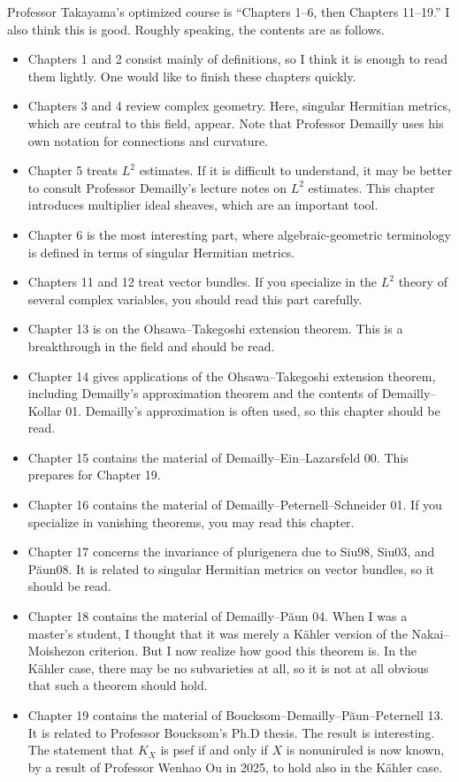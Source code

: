 Professor Takayama's optimized course is ``Chapters 1--6, then Chapters 11--19.'' I also think this is good. Roughly speaking, the contents are as follows.
\vspace{-8pt}
\begin{itemize}[left=0pt]
  \setlength{\parskip}{0cm} %
  \setlength{\itemsep}{0cm} %
\item Chapters 1 and 2 consist mainly of definitions, so I think it is enough to read them lightly. One would like to finish these chapters quickly.
\item Chapters 3 and 4 review complex geometry. Here, singular Hermitian metrics, which are central to this field, appear. Note that Professor Demailly uses his own notation for connections and curvature.
\item Chapter 5 treats $L^2$ estimates. If it is difficult to understand, it may be better to consult Professor Demailly's lecture notes on $L^2$ estimates. This chapter introduces multiplier ideal sheaves, which are an important tool.
\item Chapter 6  is the most interesting part, where algebraic-geometric terminology is defined in terms of singular Hermitian metrics.
\item Chapters 11 and 12 treat vector bundles. If you specialize in the $L^2$ theory of several complex variables, you should read this part carefully.
\item Chapter 13 is on the Ohsawa--Takegoshi extension theorem. This is a breakthrough in the field and should be read.
\item Chapter 14 gives applications of the Ohsawa--Takegoshi extension theorem, including Demailly's approximation theorem and the contents of Demailly--Kollar  01. Demailly's approximation is often used, so this chapter should be read.
\item Chapter 15 contains the material of Demailly--Ein--Lazarsfeld 00. This prepares for Chapter 19.
\item Chapter 16 contains the material of Demailly--Peternell--Schneider 01. If you specialize in vanishing theorems, you may read this chapter.
\item Chapter 17 concerns the invariance of plurigenera due to Siu98, Siu03, and P\u{a}un08. It is related to singular Hermitian metrics on vector bundles, so it should be read.
\item Chapter 18 contains the material of Demailly--P\u{a}un 04. When I was a master's student, I thought that it was merely a K\"ahler version of the Nakai--Moishezon criterion. But I now realize how good this theorem is. In the K\"ahler case, there may be no subvarieties at all, so it is not at all obvious that such a theorem should hold.
\item Chapter 19 contains the material of Boucksom--Demailly--P\u{a}un--Peternell 13. It is related to Professor Boucksom's Ph.D thesis. The result is interesting. The statement that $K_X$ is psef if and only if $X$ is nonuniruled is now known, by a result of Professor Wenhao Ou in 2025, to hold also in the K\"ahler case.
\end{itemize}
